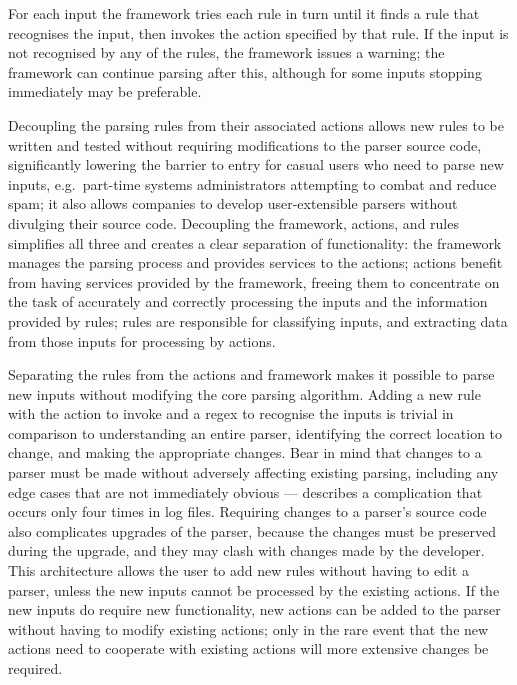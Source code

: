For each input the framework tries each rule in turn until it finds a rule
that recognises the input, then invokes the action specified by that rule.
If the input is not recognised by any of the rules, the framework issues a
warning; the framework can continue parsing after this, although for some
inputs stopping immediately may be preferable.

\label{why separate rules, actions, and framework?}

Decoupling the parsing rules from their associated actions allows new rules
to be written and tested without requiring modifications to the parser
source code, significantly lowering the barrier to entry for casual users
who need to parse new inputs, e.g.\ part-time systems administrators
attempting to combat and reduce spam; it also allows companies to develop
user-extensible parsers without divulging their source code.  Decoupling
the framework, actions, and rules simplifies all three and creates a clear
separation of functionality: the framework manages the parsing process and
provides services to the actions; actions benefit from having services
provided by the framework, freeing them to concentrate on the task of
accurately and correctly processing the inputs and the information provided
by rules; rules are responsible for classifying inputs, and extracting data
from those inputs for processing by actions.

Separating the rules from the actions and framework makes it possible to
parse new inputs without modifying the core parsing algorithm.  Adding a
new rule with the action to invoke and a regex to recognise the inputs is
trivial in comparison to understanding an entire parser, identifying the
correct location to change, and making the appropriate changes.  Bear in
mind that changes to a parser must be made without adversely affecting
existing parsing, including any edge cases that are not immediately obvious
---  describes a
complication that occurs only four times in \numberOFlogFILES{} log files.
Requiring changes to a parser's source code also complicates upgrades of
the parser, because the changes must be preserved during the upgrade, and
they may clash with changes made by the developer.  This architecture
allows the user to add new rules without having to edit a parser, unless
the new inputs cannot be processed by the existing actions.  If the new
inputs do require new functionality, new actions can be added to the parser
without having to modify existing actions; only in the rare event that the
new actions need to cooperate with existing actions will more extensive
changes be required.

